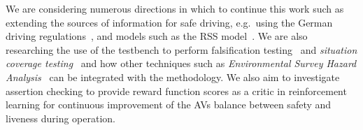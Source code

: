 We are considering numerous directions in which to continue this work such as extending the sources of information for safe driving, e.g.\ using the German driving regulations~\cite{acountability}, and models such as the RSS model~\cite{RSS_Shalev_Shwartz2017,RSS2_Koopman2019}. We are also researching the use of the testbench to perform falsification testing~\cite{corso2020survey, akazaki2017causality} and \emph{situation coverage testing}~\cite{alexander2015} and how other techniques such as \emph{Environmental Survey Hazard Analysis}~\cite{harper2021towards} can be integrated with the methodology. We also aim to investigate assertion checking to provide reward function scores as a critic in reinforcement learning for continuous improvement of the AVs balance between safety and liveness during operation.
    
    

